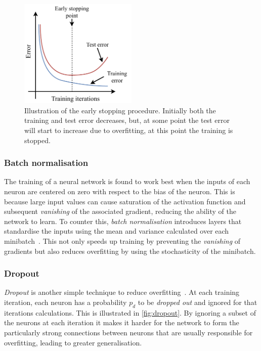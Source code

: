 \begin{figure} %
    \includegraphics[width=0.5\textwidth]{diagrams/6-cvn/early_stopping.pdf}
    \caption[Illustration of the early stopping procedure.]
    {Illustration of the early stopping procedure. Initially both the training and test error
        decreases, but, at some point the test error will start to increase due to overfitting, at
        this point the training is stopped.}
    \label{fig:early_stopping}
\end{figure}

\subsubsection*{Batch normalisation} %

The training of a neural network is found to work best when the inputs of each neuron are centered
on zero with respect to the bias of the neuron. This is because large input values can cause
saturation of the activation function and subsequent \emph{vanishing} of the associated gradient,
reducing the ability of the network to learn. To counter this, \emph{batch normalisation}
introduces layers that standardise the inputs using the mean and variance calculated over each
minibatch~\cite{ioffe2015}. This not only speeds up training by preventing the \emph{vanishing} of
gradients but also reduces overfitting by using the stochasticity of the minibatch.

\subsubsection*{Dropout} %

\emph{Dropout} is another simple technique to reduce overfitting~\cite{hinton2012}. At each
training iteration, each neuron has a probability $p_{d}$ to be \emph{dropped out} and ignored for
that iterations calculations. This is illustrated in \ref{fig:dropout}. By ignoring a subset of
the neurons at each iteration it makes it harder for the network to form the particularly strong
connections between neurons that are usually responsible for overfitting, leading to greater
generalisation.

